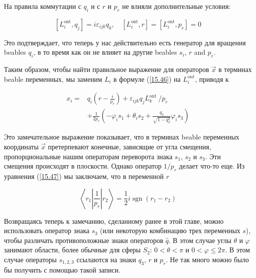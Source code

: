 \documentclass[main.tex]{subfiles}
\begin{document}
На правила коммутации с $q_i$ и с $r$ и $p_r$ не влияли дополнительные условия:

\begin{equation}\label{15.59}
	\left[L_{i}^{\mathrm{ont}}, q_{j}\right]=i \varepsilon_{i j k} q_{k}, \quad\left[L_{i}^{\mathrm{ont}}, r\right]=\left[L_{i}^{\mathrm{ont}}, p_{r}\right]=0
\end{equation}

Это подтверждает, что теперь у нас действительно есть генератор для вращения beables $q_i$, в то время как он не влияет на другие beables $s_i$, $r$ and $p_r$.

Таким образом, чтобы найти правильное выражение для операторов $\vec x$ в терминах beable переменных, мы заменим $L_i$ в формуле (\ref{15.46}) на $L_i^{ont}$, приводя к

\begin{equation}\label{15.60}
	\begin{aligned}
x_{i}=& q_{i}\left(r-\frac{i}{p_{r}}\right)+\varepsilon_{i j k} q_{j} L_{k}^{\text {ont }} / p_{r} \\
&+\frac{1}{2 p_{r}}\left(-\varphi_{i} s_{1}+\theta_{i} s_{2}+\frac{q_{3}}{\sqrt{1-q_{3}^{2}}} \varphi_{i} s_{3}\right)
\end{aligned}
\end{equation}

Это замечательное выражение показывает, что в терминах beable переменных координаты $\vec x$ претерпевают конечные, зависящие от угла смещения, пропорциональные нашим операторам переворота знака $s_1$, $s_2$ и $s_3$. Эти смещения происходят в плоскости. Однако оператор $1 / p_r$ делает что-то еще. Из уравнения (\ref{15.47}) мы заключаем, что в переменной $r$

\begin{equation}\label{15.61}
	\left\langle r_{1}\left|\frac{1}{p_{r}}\right| r_{2}\right\rangle=\frac{1}{2} i \operatorname{sgn}\left(r_{1}-r_{2}\right)
\end{equation}

Возвращаясь теперь к замечанию, сделанному ранее в этой главе, можно использовать оператор знака $s_3$ (или некоторую комбинацию трех переменных $s$), чтобы различать противоположные знаки операторов $\hat q$. В этом случае углы $\theta$ и $\varphi$ занимают области, более обычные для сферы $S_2$: $0 <\theta <\pi$ и $0 <\varphi \le 2\pi$. В этом случае операторы $s_{1,2,3}$ ссылаются на знаки $q_3$, $r$ и $p_r$. Не так много можно было бы получить с помощью такой записи.
\end{document}
